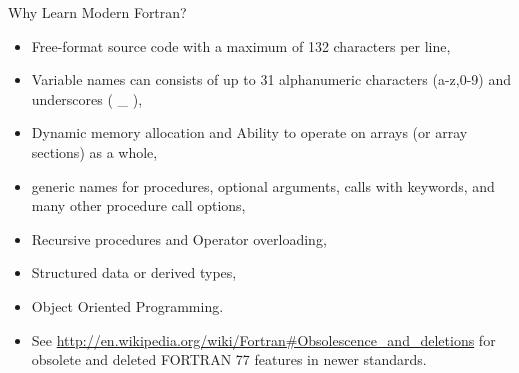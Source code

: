 \documentclass[c,mathserif,compress,xcolor=svgnames]{beamer}
\newenvironment{eblock}[0]
{
\begin{beamerboxesrounded}[upper=uppercol2,lower=lowercol2,shadow=true]}
{\end{beamerboxesrounded}}
\begin{document}
\begin{frame}{Why Learn Modern Fortran?}
  \begin{itemize}
    \item Free-format source code with a maximum of 132 characters per line,
    \item Variable names can consists of up to 31 alphanumeric characters (a-z,0-9) and underscores ( \_ ),
    \item Dynamic memory allocation and Ability to operate on arrays (or array sections) as a whole,
    \item generic names for procedures, optional arguments, calls with keywords, and many other procedure call options,
    \item Recursive procedures and Operator overloading,
    \item Structured data or derived types,
    \item Object Oriented Programming.
    \item See \url{http://en.wikipedia.org/wiki/Fortran\#Obsolescence_and_deletions} for obsolete and deleted FORTRAN 77 features in newer standards.
  \end{itemize}
\end{frame}

\begin{frame}[fragile]{FORTRAN 90 Example}
  \begin{eblock}{SAXPY Code}
    Fortran},basicstyle=\fontsize{6}{5}\selectfont\ttfamily]{./Exercise/saxpy.f90}
  \end{eblock}
\end{frame}
\end{document}
